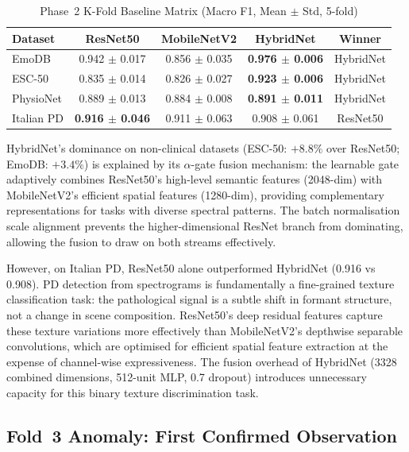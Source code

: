 \documentclass[oneside,openany]{final_report}
\begin{document}
\begin{table}[H]
\centering
\caption{Phase~2 K-Fold Baseline Matrix (Macro F1, Mean $\pm$ Std, 5-fold)}
\label{tab:phase2}
\begin{tabular}{l c c c c}
\toprule
\textbf{Dataset} & \textbf{ResNet50} & \textbf{MobileNetV2} & \textbf{HybridNet} & \textbf{Winner} \\
\midrule
EmoDB & 0.942 $\pm$ 0.017 & 0.856 $\pm$ 0.035 & \textbf{0.976 $\pm$ 0.006} & HybridNet \\
ESC-50 & 0.835 $\pm$ 0.014 & 0.826 $\pm$ 0.027 & \textbf{0.923 $\pm$ 0.006} & HybridNet \\
PhysioNet & 0.889 $\pm$ 0.013 & 0.884 $\pm$ 0.008 & \textbf{0.891 $\pm$ 0.011} & HybridNet \\
Italian PD & \textbf{0.916 $\pm$ 0.046} & 0.911 $\pm$ 0.063 & 0.908 $\pm$ 0.061 & ResNet50 \\
\bottomrule
\end{tabular}
\end{table}

HybridNet's dominance on non-clinical datasets (ESC-50: $+8.8\%$ over ResNet50; EmoDB: $+3.4\%$) is explained by its $\alpha$-gate fusion mechanism: the learnable gate adaptively combines ResNet50's high-level semantic features (2048-dim) with MobileNetV2's efficient spatial features (1280-dim), providing complementary representations for tasks with diverse spectral patterns. The batch normalisation scale alignment prevents the higher-dimensional ResNet branch from dominating, allowing the fusion to draw on both streams effectively.

However, on Italian PD, ResNet50 alone outperformed HybridNet (0.916 vs 0.908). PD detection from spectrograms is fundamentally a fine-grained texture classification task: the pathological signal is a subtle shift in formant structure, not a change in scene composition. ResNet50's deep residual features capture these texture variations more effectively than MobileNetV2's depthwise separable convolutions, which are optimised for efficient spatial feature extraction at the expense of channel-wise expressiveness. The fusion overhead of HybridNet (3328 combined dimensions, 512-unit MLP, 0.7 dropout) introduces unnecessary capacity for this binary texture discrimination task.

\subsection{Fold~3 Anomaly: First Confirmed Observation}
\label{subsec:fold3}
\end{document}
